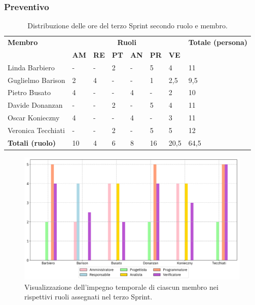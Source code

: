 \subsubsection{Preventivo}
\begin{table}[ht!]
    \centering
    \begin{tabular}{p{4cm} p{1cm} p{1cm} p{1cm} p{1cm} p{1cm} p{1cm} p{3cm}}
        \toprule
        \textbf{Membro} & \multicolumn{6}{c}{\textbf{Ruoli}} & \textbf{Totale (persona)}\\
		& \textbf{AM} & \textbf{RE} & \textbf{PT} & \textbf{AN} & \textbf{PR} & \textbf{VE}\\
		\midrule
        Linda Barbiero       & -   & -   & 2   & -   & 5   & 4   & 11 \\
        Guglielmo Barison    & 2   & 4   & -   & -   & 1   & 2,5 & 9,5 \\
        Pietro Busato        & 4   & -   & -   & 4   & -   & 2   & 10 \\
        Davide Donanzan      & -   & -   & 2   & -   & 5   & 4   & 11 \\
        Oscar Konieczny      & 4   & -   & -   & 4   & -   & 3   & 11 \\
        Veronica Tecchiati   & -   & -   & 2   & -   & 5   & 5   & 12 \\
        \bottomrule
        \textbf{Totali (ruolo)} & 10 & 4 & 6 & 8 & 16 & 20,5 & 64,5 \\
    \end{tabular}
    \caption{Distribuzione delle ore del terzo Sprint secondo ruolo e membro.}
    \label{table:Distribuzione delle ore del terzo Sprint secondo ruolo e membro}
\end{table}
\begin{figure}[ht!]
    \centering
    \includegraphics[width=15cm]{./asset/istogramma_periodo_3.png}
    \caption{Visualizzazione dell’impegno temporale di ciascun membro nei rispettivi ruoli assegnati
    nel terzo Sprint.}
    \label{figure:Visualizzazione dell’impegno temporale di ciascun membro nei rispettivi ruoli
    assegnati nel terzo Sprint}
\end{figure}
